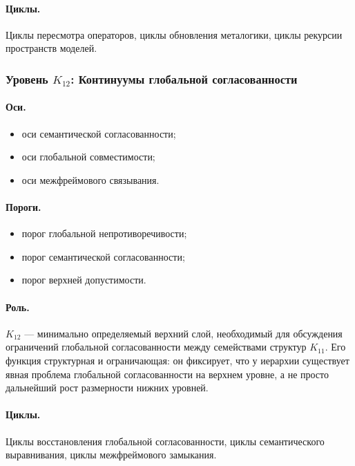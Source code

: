\paragraph{Циклы.}
Циклы пересмотра операторов, циклы обновления металогики,
циклы рекурсии пространств моделей.

\subsubsection{Уровень \(K_{12}\): Континуумы глобальной согласованности}

\paragraph{Оси.}
\begin{itemize}
    \item оси семантической согласованности;
    \item оси глобальной совместимости;
    \item оси межфреймового связывания.
\end{itemize}

\paragraph{Пороги.}
\begin{itemize}
    \item порог глобальной непротиворечивости;
    \item порог семантической согласованности;
    \item порог верхней допустимости.
\end{itemize}

\paragraph{Роль.}
\(K_{12}\) — минимально определяемый верхний слой, необходимый для обсуждения
ограничений глобальной согласованности между семействами структур \(K_{11}\).
Его функция структурная и ограничающая: он фиксирует, что у иерархии существует
явная проблема глобальной согласованности на верхнем уровне, а не просто дальнейший
рост размерности нижних уровней.

\paragraph{Циклы.}
Циклы восстановления глобальной согласованности, циклы семантического выравнивания,
циклы межфреймового замыкания.


